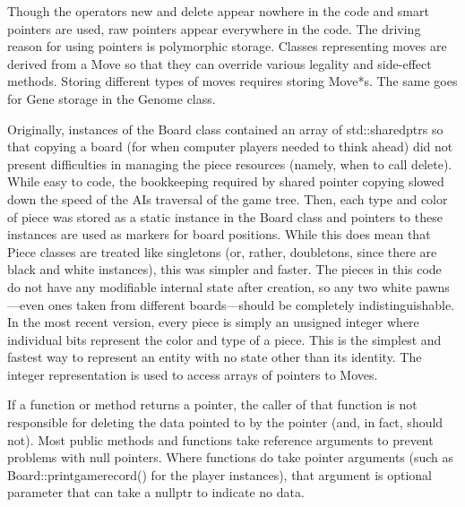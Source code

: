 \documentclass[letterpaper]{article}
\newcommand{\code}[1]{\small\textsf{#1}}
\renewcommand{\_}{\allowbreak\textunderscore\allowbreak}
\begin{document}
Though the operators \code{new} and \code{delete} appear nowhere in the code and smart pointers are used, raw pointers appear everywhere in the code. The driving reason for using pointers is polymorphic storage. Classes representing moves are derived from a \code{Move} so that they can override various legality and side-effect methods. Storing different types of moves requires storing \code{Move*}s. The same goes for \code{Gene} storage in the \code{Genome} class.

Originally, instances of the \code{Board} class contained an array of \code{std::shared\_ptr}s so that copying a board (for when computer players needed to think ahead) did not present difficulties in managing the piece resources (namely, when to call \code{delete}). While easy to code, the bookkeeping required by shared pointer copying slowed down the speed of the AIs traversal of the game tree. Then, each type and color of piece was stored as a static instance in the \code{Board} class and pointers to these instances are used as markers for board positions. While this does mean that \code{Piece} classes are treated like singletons (or, rather, doubletons, since there are black and white instances), this was simpler and faster. The pieces in this code do not have any modifiable internal state after creation, so any two white pawns---even ones taken from different boards---should be completely indistinguishable. In the most recent version, every piece is simply an unsigned integer where individual bits represent the color and type of a piece. This is the simplest and fastest way to represent an entity with no state other than its identity. The integer representation is used to access arrays of pointers to \code{Move}s.

If a function or method returns a pointer, the caller of that function is not responsible for deleting the data pointed to by the pointer (and, in fact, should not). Most public methods and functions take reference arguments to prevent problems with null pointers. Where functions do take pointer arguments (such as \code{Board::print\_game\_record()} for the player instances), that argument is optional parameter that can take a \code{nullptr} to indicate no data.
\end{document}
